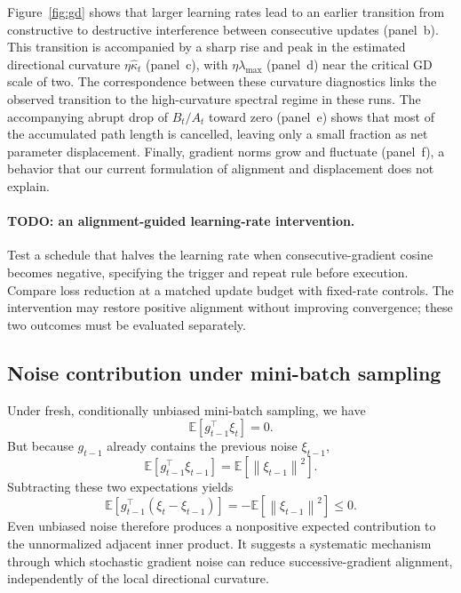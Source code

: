 \documentclass[11pt]{article}
\newcommand{\norm}[1]{\left\lVert#1\right\rVert}
\newcommand{\E}{\mathbb{E}}
\begin{document}
\clearpage

Figure~\ref{fig:gd} shows that larger learning rates lead to an earlier
transition from constructive to destructive interference between consecutive
updates (panel~b). This transition is accompanied by a sharp rise and peak in
the estimated directional curvature $\eta\widehat\kappa_t$ (panel~c), with
$\eta\lambda_{\max}$ (panel~d) near the critical GD scale of two. The
correspondence between these curvature diagnostics links the observed
transition to the high-curvature spectral regime in these runs. The
accompanying abrupt drop of $B_t/A_t$ toward zero (panel~e) shows that most of
the accumulated path length is cancelled, leaving only a small fraction as
net parameter displacement. Finally, gradient norms grow and fluctuate
(panel~f), a behavior that our current formulation of alignment and
displacement does not explain.

\paragraph{TODO: an alignment-guided learning-rate intervention.}
Test a schedule that halves the learning rate when consecutive-gradient cosine
becomes negative, specifying the trigger and repeat rule before execution.
Compare loss reduction at a matched update budget with fixed-rate controls.
The intervention may restore positive alignment without improving convergence;
these two outcomes must be evaluated separately.

\subsection{Noise contribution under mini-batch sampling}

Under fresh, conditionally unbiased mini-batch sampling, we have
\begin{equation}
  \E[g_{t-1}^\top\xi_t]=0.
  \label{eq:fresh-noise}
\end{equation}
But because \(g_{t-1}\) already contains the previous noise \(\xi_{t-1}\),
\begin{equation}
  \E[g_{t-1}^\top\xi_{t-1}]=\E[\norm{\xi_{t-1}}^2].
\end{equation}
Subtracting these two expectations yields
\begin{equation}
  \E[g_{t-1}^\top(\xi_t-\xi_{t-1})]
              =-\E[\norm{\xi_{t-1}}^2]\leq0.
  \label{eq:noise-expectation}
\end{equation}
Even unbiased noise therefore produces a nonpositive expected contribution to
the unnormalized adjacent inner product. It suggests a systematic mechanism through which stochastic gradient noise can reduce successive-gradient alignment, independently of the local directional curvature.
\end{document}

